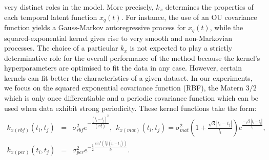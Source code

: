 \documentclass{article} %
\begin{document}
very distinct roles in the model. More precisely, 
$k_x$ determines the properties of each temporal 
latent function $x_q(t)$. For instance, the use of an
OU covariance function yields a Gauss-Markov autoregressive 
process for $x_q(t)$, while the squared-exponential 
kernel gives rise to very smooth and 
non-Markovian processes. The choice of a particular $k_x$ 
is not expected to play a strictly determinative role for 
the overall performance of the method because the kernel's 
hyperparameters are optimised to fit the data in any case. However, 
certain kernels can fit better the characteristics of a given dataset. 
In our experiments, we focus on the squared exponential covariance function
(RBF), the Matern $3/2$ 
which is only once
differentiable and a periodic covariance function
\cite{rasmussen-williams, MacKay98} which
can be used when data exhibit strong periodicity. These kernel
functions take the form:
\begin{eqnarray}
k_{x(rbf)} \left( \mathit{t_i, t_j} \right) 
& = & \sigma_{rbf}^2 e^{- \frac{\left( t_i - t_j \right)^2}{\left(
      2l_t^2 \right)}}, 
\ \ k_{x(mat)} \left( t_i, t_j \right) =  
\sigma_{mat}^2 \left( 1 + \frac{\sqrt{3} |t_i - t_j|}{l_t} \right)
		e^{\frac{ - \sqrt{3} |t_i - t_j|}{l_t} }, \nonumber \\
k_{x(per)} \left( \mathit{t_i, t_j} \right) 
& = & 
	\sigma_{per}^2 e^{-\frac{1}{2} \frac{sin^2 \left( \frac{2
                \pi}{T} \left( t_i - t_j \right) \right) }{l_t} }. 
 \label{eq:temporalkernels}
\end{eqnarray}
%  
%
%
%
\end{document}

